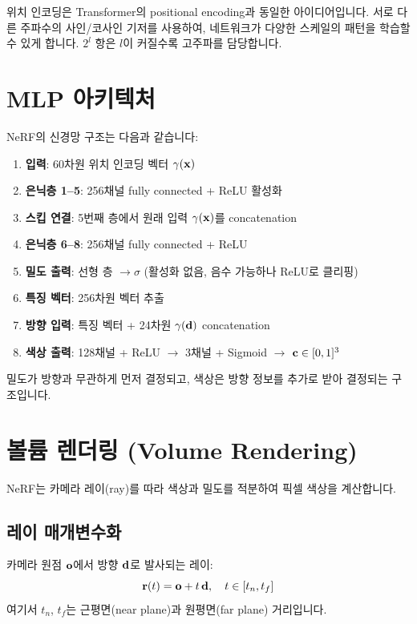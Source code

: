\documentclass[11pt, a4paper]{report}
\begin{document}
\begin{remark}
위치 인코딩은 Transformer의 positional encoding과 동일한 아이디어입니다. 서로 다른 주파수의 사인/코사인 기저를 사용하여, 네트워크가 다양한 스케일의 패턴을 학습할 수 있게 합니다. $2^l$ 항은 $l$이 커질수록 고주파를 담당합니다.
\end{remark}


\section{MLP 아키텍처}

NeRF의 신경망 구조는 다음과 같습니다:

\begin{enumerate}[leftmargin=*]
  \item \textbf{입력}: 60차원 위치 인코딩 벡터 $\gamma(\mathbf{x})$
  \item \textbf{은닉층 1--5}: 256채널 fully connected + ReLU 활성화
  \item \textbf{스킵 연결}: 5번째 층에서 원래 입력 $\gamma(\mathbf{x})$를 concatenation
  \item \textbf{은닉층 6--8}: 256채널 fully connected + ReLU
  \item \textbf{밀도 출력}: 선형 층 $\rightarrow \sigma$ (활성화 없음, 음수 가능하나 ReLU로 클리핑)
  \item \textbf{특징 벡터}: 256차원 벡터 추출
  \item \textbf{방향 입력}: 특징 벡터 + 24차원 $\gamma(\mathbf{d})$ concatenation
  \item \textbf{색상 출력}: 128채널 + ReLU $\rightarrow$ 3채널 + Sigmoid $\rightarrow$ $\mathbf{c} \in [0,1]^3$
\end{enumerate}

밀도가 방향과 무관하게 먼저 결정되고, 색상은 방향 정보를 추가로 받아 결정되는 구조입니다.


\section{볼륨 렌더링 (Volume Rendering)}
\label{sec:volume_rendering}

NeRF는 카메라 레이(ray)를 따라 색상과 밀도를 적분하여 픽셀 색상을 계산합니다.

\subsection{레이 매개변수화}

카메라 원점 $\mathbf{o}$에서 방향 $\mathbf{d}$로 발사되는 레이:
\begin{equation}
\mathbf{r}(t) = \mathbf{o} + t\,\mathbf{d}, \quad t \in [t_n, t_f]
\label{eq:ray}
\end{equation}
여기서 $t_n$, $t_f$는 근평면(near plane)과 원평면(far plane) 거리입니다.
\end{document}
